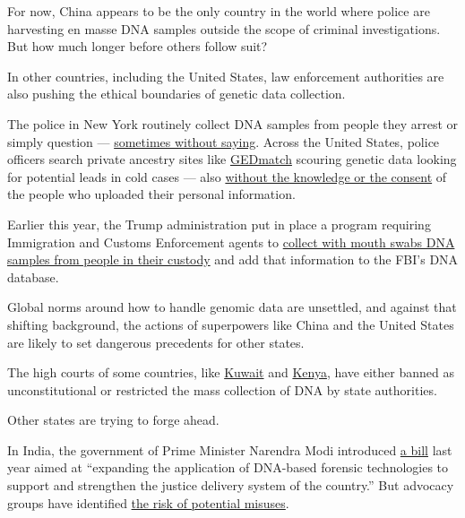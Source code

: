For now, China appears to be the only country in the world where police
are harvesting en masse DNA samples outside the scope of criminal
investigations. But how much longer before others follow suit?

In other countries, including the United States, law enforcement
authorities are also pushing the ethical boundaries of genetic data
collection.

The police in New York routinely collect DNA samples from people they
arrest or simply question ---
\href{https://www.nytimes3xbfgragh.onion/2019/08/15/nyregion/nypd-dna-database.html}{sometimes
without saying}. Across the United States, police officers search
private ancestry sites like \href{https://www.gedmatch.com/}{GEDmatch}
scouring genetic data looking for potential leads in cold cases --- also
\href{https://www.sciencemag.org/news/2019/11/judge-said-police-can-search-dna-millions-americans-without-their-consent-what-s-next}{without
the knowledge or the consent} of the people who uploaded their personal
information.

Earlier this year, the Trump administration put in place a program
requiring Immigration and Customs Enforcement agents to
\href{https://www.dhs.gov/sites/default/files/publications/privacy-pia-dhs080-detaineedna-january2020.pdf}{collect
with mouth swabs DNA samples from people in their custody} and add that
information to the FBI's DNA database.

Global norms around how to handle genomic data are unsettled, and
against that shifting background, the actions of superpowers like China
and the United States are likely to set dangerous precedents for other
states.

The high courts of some countries, like
\href{https://www.hrw.org/news/2017/10/17/kuwait-court-strikes-down-draconian-dna-law}{Kuwait}
and
\href{https://www.reuters.com/article/us-kenya-rights/court-orders-safeguards-for-kenyan-digital-ids-bans-dna-collecting-idUSKBN1ZU23D}{Kenya},
have either banned as unconstitutional or restricted the mass collection
of DNA by state authorities.

Other states are trying to forge ahead.

In India, the government of Prime Minister Narendra Modi introduced
\href{https://pib.gov.in/Pressreleaseshare.aspx?PRID=1577738}{a bill}
last year aimed at ``expanding the application of DNA-based forensic
technologies to support and strengthen the justice delivery system of
the country.'' But advocacy groups have identified
\href{http://www.genewatch.org/uploads/f03c6d66a9b354535738483c1c3d49e4/comments-on-india-dna-bill-2019.pdf}{the
risk of potential misuses}.

